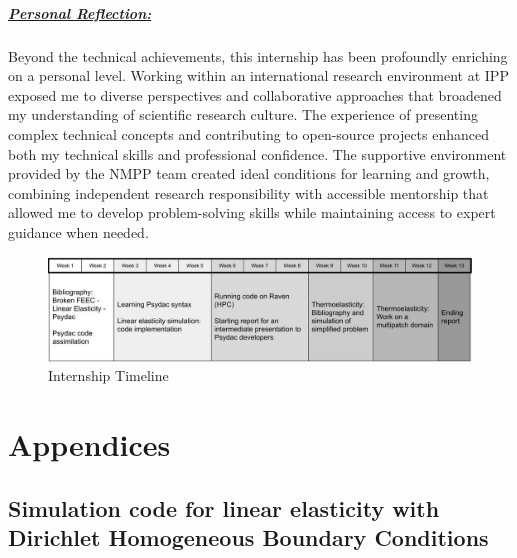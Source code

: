 \documentclass[a4paper,12pt,twoside]{report}
\begin{document}
\paragraph{\underline{Personal Reflection:}}
Beyond the technical achievements, this internship has been profoundly enriching on a personal level. Working within an international research environment at IPP exposed me to diverse perspectives and collaborative approaches that broadened my understanding of scientific research culture. The experience of presenting complex technical concepts and contributing to open-source projects enhanced both my technical skills and professional confidence. The supportive environment provided by the NMPP team created ideal conditions for learning and growth, combining independent research responsibility with accessible mentorship that allowed me to develop problem-solving skills while maintaining access to expert guidance when needed.

\begin{figure}[!t]
	\centering
	\includegraphics[width=1\textwidth]{figures/Timeline.jpg}
	\caption{Internship Timeline}
	\label{fig:internship_timeline}
\end{figure}

\newpage
\vspace{-1cm}
\printbibliography[heading=bibnumbered]

\newpage
\chapter{Appendices}
\section{Simulation code for linear elasticity with Dirichlet Homogeneous Boundary Conditions}
\label{sec:lin_elas_dirichlet}
\end{document}
